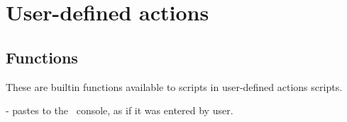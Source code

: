 \chapter{User-defined actions}

\section{Functions}

These are builtin functions available to scripts in user-defined actions scripts.

 - pastes  to the \gap\ console, as if it
was entered by user.
